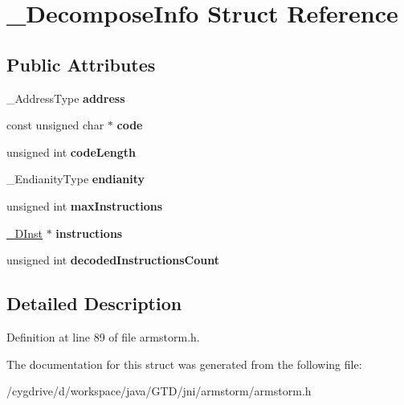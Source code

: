 \hypertarget{struct__DecomposeInfo}{\section{\-\_\-\-Decompose\-Info Struct Reference}
\label{struct__DecomposeInfo}
}
\subsection*{Public Attributes}
\begin{DoxyCompactItemize}
\item 
\hypertarget{struct__DecomposeInfo_ab9b6fca90d249d9c9cb4032082c62a50}{\-\_\-\-Address\-Type {\bfseries address}}\label{struct__DecomposeInfo_ab9b6fca90d249d9c9cb4032082c62a50}

\item 
\hypertarget{struct__DecomposeInfo_a46be9802a15d4c17c248ec8801830290}{const unsigned char $\ast$ {\bfseries code}}\label{struct__DecomposeInfo_a46be9802a15d4c17c248ec8801830290}

\item 
\hypertarget{struct__DecomposeInfo_a3c63f1d6b0b43702df3a5bae0ba77757}{unsigned int {\bfseries code\-Length}}\label{struct__DecomposeInfo_a3c63f1d6b0b43702df3a5bae0ba77757}

\item 
\hypertarget{struct__DecomposeInfo_a356cb30421a8c0944410c5bebdc01c80}{\-\_\-\-Endianity\-Type {\bfseries endianity}}\label{struct__DecomposeInfo_a356cb30421a8c0944410c5bebdc01c80}

\item 
\hypertarget{struct__DecomposeInfo_a8cada49b116281f01de0ff386d40b4a8}{unsigned int {\bfseries max\-Instructions}}\label{struct__DecomposeInfo_a8cada49b116281f01de0ff386d40b4a8}

\item 
\hypertarget{struct__DecomposeInfo_af1288440e70228123c0c522e5dc08e49}{\hyperlink{struct__DInst}{\-\_\-\-D\-Inst} $\ast$ {\bfseries instructions}}\label{struct__DecomposeInfo_af1288440e70228123c0c522e5dc08e49}

\item 
\hypertarget{struct__DecomposeInfo_ae17a17fa87dbe5b4afa957a990f11ee7}{unsigned int {\bfseries decoded\-Instructions\-Count}}\label{struct__DecomposeInfo_ae17a17fa87dbe5b4afa957a990f11ee7}

\end{DoxyCompactItemize}


\subsection{Detailed Description}


Definition at line 89 of file armstorm.\-h.



The documentation for this struct was generated from the following file\-:\begin{DoxyCompactItemize}
\item 
/cygdrive/d/workspace/java/\-G\-T\-D/jni/armstorm/armstorm.\-h\end{DoxyCompactItemize}
